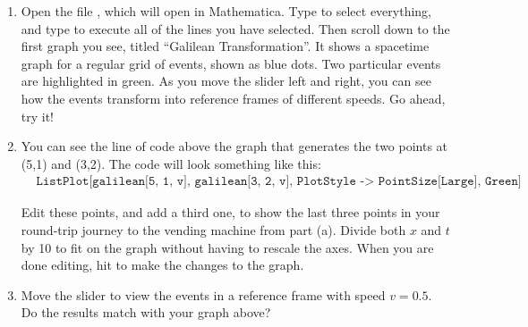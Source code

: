 \begin{enumerate}[labparts]

\item Open the file , which will open in Mathematica.  Type  to select everything, and type  to execute all of the lines you have selected.  Then scroll down to the first graph you see, titled ``Galilean Transformation''.    It shows a spacetime graph for a regular grid of events, shown as blue dots.  Two particular events are highlighted in green.  As you move the slider left and right, you can see how the events transform into reference frames of different speeds.  Go ahead, try it!

\item You can see the line of code above the graph that generates the two points at (5,1) and (3,2).  The code will look something like this:
\begin{align*}
&\texttt{ListPlot[{galilean[5, 1, v], galilean[3, 2, v]}, PlotStyle -> {PointSize[Large], Green}]}
\end{align*}


Edit these points, and add a third one, to show the last three points in your round-trip journey to the vending machine from part (a).  Divide both $x$ and $t$ by 10 to fit on the graph without having to rescale the axes.  When you are done editing, hit  to make the changes to the graph.

\item Move the slider to view the events in a reference frame with speed $v=0.5$.  Do the results match with your graph above?
\answerspace{0.6in}

\end{enumerate}

